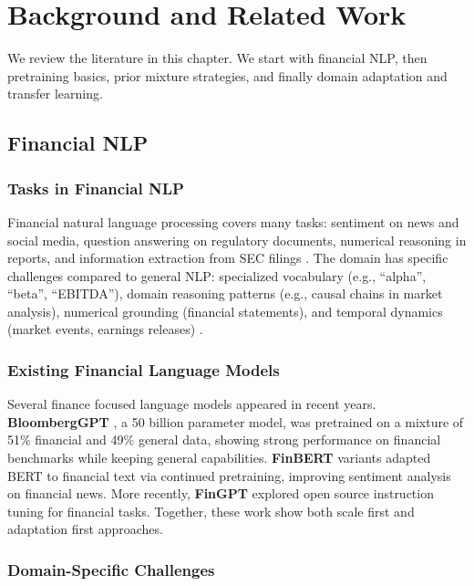 \chapter{Background and Related Work}

We review the literature in this chapter. We start with financial NLP, then pretraining basics, prior mixture strategies, and finally domain adaptation and transfer learning.

\section{Financial NLP}

\subsection{Tasks in Financial NLP}

Financial natural language processing covers many tasks: sentiment on news and social media, question answering on regulatory documents, numerical reasoning in reports, and information extraction from SEC filings \parencite{araci2019finbert, chen2021finqa}. The domain has specific challenges compared to general NLP: specialized vocabulary (e.g., ``alpha'', ``beta'', ``EBITDA''), domain reasoning patterns (e.g., causal chains in market analysis), numerical grounding (financial statements), and temporal dynamics (market events, earnings releases) \parencite{wu2023bloomberggpt, araci2019finbert}. 

\subsection{Existing Financial Language Models}

Several finance focused language models appeared in recent years. \textbf{BloombergGPT} \parencite{wu2023bloomberggpt}, a 50 billion parameter model, was pretrained on a mixture of 51\% financial and 49\% general data, showing strong performance on financial benchmarks while keeping general capabilities. \textbf{FinBERT} variants \parencite{araci2019finbert, yang2020finbert} adapted BERT to financial text via continued pretraining, improving sentiment analysis on financial news. More recently, \textbf{FinGPT} \parencite{yang2023fingpt} explored open source instruction tuning for financial tasks. Together, these work show both scale first and adaptation first approaches.

\subsection{Domain-Specific Challenges}

